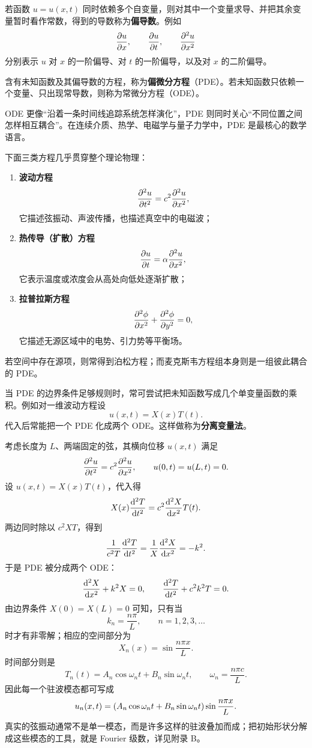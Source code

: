 \begin{definition}
若函数 $u=u(x,t)$ 同时依赖多个自变量，则对其中一个变量求导、并把其余变量暂时看作常数，得到的导数称为\textbf{偏导数}。例如
\[
  \pdv{u}{x},\qquad \pdv{u}{t},\qquad \pdv[2]{u}{x}
\]
分别表示 $u$ 对 $x$ 的一阶偏导、对 $t$ 的一阶偏导，以及对 $x$ 的二阶偏导。
\end{definition}

\begin{definition}
含有未知函数及其偏导数的方程，称为\textbf{偏微分方程}（PDE）。若未知函数只依赖一个变量、只出现常导数，则称为常微分方程（ODE）。
\end{definition}

ODE 更像“沿着一条时间线追踪系统怎样演化”，PDE 则同时关心“不同位置之间怎样相互耦合”。在连续介质、热学、电磁学与量子力学中，PDE 是最核心的数学语言。

\begin{example}
下面三类方程几乎贯穿整个理论物理：
\begin{enumerate}
  \item \textbf{波动方程}
  \[
    \pdv[2]{u}{t}=c^2\pdv[2]{u}{x},
  \]
  它描述弦振动、声波传播，也描述真空中的电磁波；
  \item \textbf{热传导（扩散）方程}
  \[
    \pdv{u}{t}=\alpha\pdv[2]{u}{x},
  \]
  它表示温度或浓度会从高处向低处逐渐扩散；
  \item \textbf{拉普拉斯方程}
  \[
    \pdv[2]{\phi}{x}+\pdv[2]{\phi}{y}=0,
  \]
  它描述无源区域中的电势、引力势等平衡场。
\end{enumerate}
若空间中存在源项，则常得到泊松方程；而麦克斯韦方程组本身则是一组彼此耦合的 PDE。
\end{example}

\begin{theorem}[分离变量的基本思想]
当 PDE 的边界条件足够规则时，常可尝试把未知函数写成几个单变量函数的乘积。例如对一维波动方程设
\[
  u(x,t)=X(x)T(t).
\]
代入后常能把一个 PDE 化成两个 ODE。这样做称为\textbf{分离变量法}。
\end{theorem}

\begin{example}[驻波解的由来]
考虑长度为 $L$、两端固定的弦，其横向位移 $u(x,t)$ 满足
\[
  \pdv[2]{u}{t}=c^2\pdv[2]{u}{x},
  \qquad u(0,t)=u(L,t)=0.
\]
设 $u(x,t)=X(x)T(t)$，代入得
\[
  X(x)\dv[2]{T}{t}=c^2\dv[2]{X}{x}T(t).
\]
两边同时除以 $c^2XT$，得到
\[
  \frac{1}{c^2T}\dv[2]{T}{t}=\frac{1}{X}\dv[2]{X}{x}=-k^2.
\]
于是 PDE 被分成两个 ODE：
\[
  \dv[2]{X}{x}+k^2X=0,
  \qquad
  \dv[2]{T}{t}+c^2k^2T=0.
\]
由边界条件 $X(0)=X(L)=0$ 可知，只有当
\[
  k_n=\frac{n\pi}{L},\qquad n=1,2,3,\dots
\]
时才有非零解；相应的空间部分为
\[
  X_n(x)=\sin\frac{n\pi x}{L}.
\]
时间部分则是
\[
  T_n(t)=A_n\cos \omega_n t+B_n\sin \omega_n t,
  \qquad
  \omega_n=\frac{n\pi c}{L}.
\]
因此每一个驻波模态都可写成
\[
  u_n(x,t)=\qty(A_n\cos \omega_n t+B_n\sin \omega_n t)\sin\frac{n\pi x}{L}.
\]
真实的弦振动通常不是单一模态，而是许多这样的驻波叠加而成；把初始形状分解成这些模态的工具，就是 Fourier 级数，详见附录 B。
\end{example}

